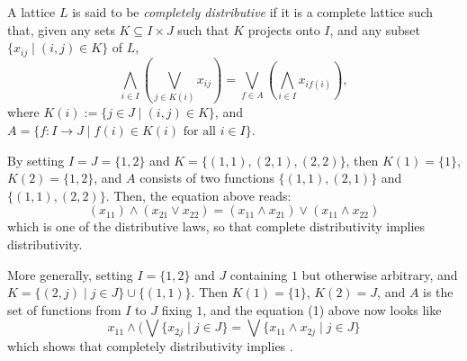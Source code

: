 \documentclass[12pt]{article}
\begin{document}
A lattice $L$ is said to be \emph{completely distributive} if it is a complete lattice such that, given any sets $K\subseteq I\times J$ such that $K$ projects onto $I$, and any subset $\lbrace x_{ij} \mid (i,j)\in K \rbrace$ of $L$,
\begin{equation}
\bigwedge_{i\in I}(\bigvee_{j\in K(i)} x_{ij})=\bigvee_{f\in A}(\bigwedge_{i\in I} x_{if(i)}),
\end{equation}
where $K(i):=\lbrace j\in J\mid (i,j)\in K\rbrace$, and $A=\lbrace f:I\to J\mid f(i)\in K(i)\mbox{ for all }i\in I\rbrace$.

By setting $I=J=\lbrace 1,2\rbrace$ and $K=\lbrace (1,1),(2,1),(2,2)\rbrace$, then $K(1)=\lbrace 1\rbrace$, $K(2)=\lbrace 1,2\rbrace$, and $A$ consists of two functions $\lbrace (1,1), (2,1)\rbrace$ and $\lbrace (1,1),(2,2)\rbrace$.  Then, the equation above reads:
$$(x_{11}) \wedge (x_{21} \vee x_{22})= (x_{11}\wedge x_{21}) \vee (x_{11}\wedge x_{22})$$
which is one of the distributive laws, so that complete distributivity implies distributivity.

More generally, setting $I=\lbrace 1,2\rbrace$ and $J$ containing $1$ but otherwise arbitrary, and $K=\lbrace (2,j)\mid j\in J\rbrace \cup \lbrace (1,1)\rbrace$.  Then $K(1)=\lbrace 1\rbrace$, $K(2)=J$, and $A$ is the set of functions from $I$ to $J$ fixing $1$, and the equation (1) above now looks like
$$x_{11} \wedge (\bigvee \lbrace x_{2j}\mid j\in J\rbrace = \bigvee \lbrace x_{11}\wedge x_{2j} \mid j\in J\rbrace$$
which shows that completely distributivity implies \emph{}.
\end{document}
